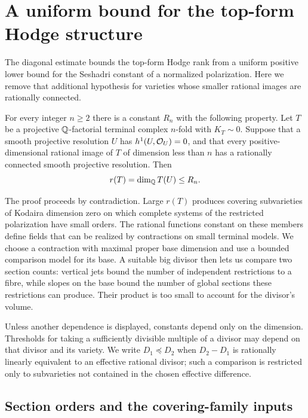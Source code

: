 \section{A uniform bound for the top-form Hodge structure}
\label{sec:rank}

The diagonal estimate bounds the top-form Hodge rank from a uniform
positive lower bound for the Seshadri constant of a normalized
polarization.  Here we remove that additional hypothesis for varieties
whose smaller rational images are rationally connected.

\begin{theorem}\label{thm:rank}
For every integer $n\ge2$ there is a constant $R_n$ with the following
property.  Let $T$ be a projective $\mathbb Q$-factorial terminal complex
$n$-fold with $K_T\sim0$.  Suppose that a smooth projective resolution
$U$ has $h^1(U,\mathcal O_U)=0$, and that every positive-dimensional rational
image of $T$ of dimension less than $n$ has a rationally connected smooth
projective resolution.  Then
\[
                         r(T)=\dim_{\mathbb Q}T(U)\le R_n.
\]
\end{theorem}

The proof proceeds by contradiction.  Large $r(T)$ produces covering
subvarieties of Kodaira dimension zero on which complete systems of the
restricted polarization have small orders.  The rational functions constant on these
members define fields that can be realized by contractions on small
terminal models.  We choose a contraction with maximal proper base
dimension and use a bounded comparison model for its base.  A suitable
big divisor then lets us compare two section counts: vertical jets
bound the number of independent restrictions to a fibre, while slopes
on the base bound the number of global sections these restrictions can
produce.  Their product is too small to account for the divisor's
volume.

Unless another dependence is displayed, constants depend only on the
dimension.  Thresholds for taking a sufficiently divisible
multiple of a divisor may depend on that divisor and its variety.  We
write $D_1\preceq D_2$ when $D_2-D_1$ is rationally linearly equivalent
to an effective rational divisor; such a comparison is restricted only
to subvarieties not contained in the chosen effective difference.

\subsection{Section orders and the covering-family inputs}

